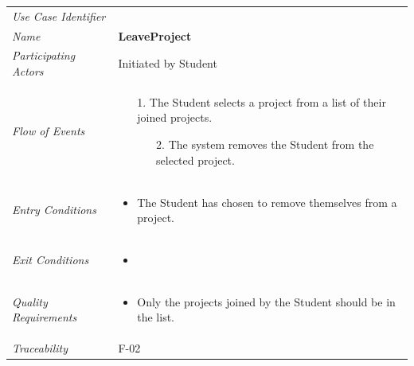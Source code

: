 \documentclass[12pt,letterpaper]{article}
\begin{document}
\begin{center}
	\begin{tabu} to 
		\toprule
		Use Case Identifier & \leaveproject{} \\
		Name & {\bf LeaveProject} \\
		Participating Actors & Initiated by Student \\
		Flow of Events & 
	    \begin{enumerate}[topsep=-1em, leftmargin=*]
		    \item[1.] The Student selects a project from a list of their joined projects.
		    \begin{enumerate}
		    		\item[2.] The system removes the Student from the selected project.
		    \end{enumerate}
		\end{enumerate} \\

		Entry Conditions &
		\begin{itemize}[topsep=-1em, leftmargin=*]
		    \item The Student has chosen to remove themselves from a project.
        \end{itemize} \\

		Exit Conditions &
		\begin{itemize}[topsep=-1em, leftmargin=*]
		    \item %
        \end{itemize} \\

		Quality Requirements &
		\begin{itemize}[topsep=-1em, leftmargin=*]
		    \item Only the projects joined by the Student should be in the list.
        \end{itemize} \\

		Traceability & F-02 \\
		\toprule
	\end{tabu}
\end{center}
\end{document}

